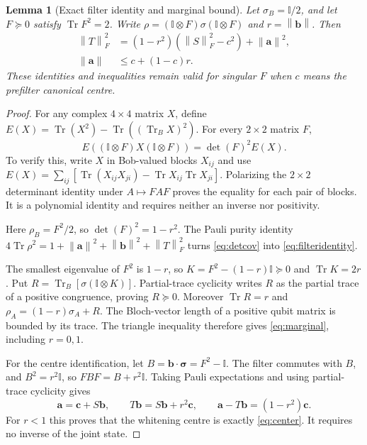 \documentclass[11pt,a4paper]{article}
\newtheorem{lemma}[theorem]{Lemma}
\theoremstyle{remark}\newtheorem{remark}[theorem]{Remark}
\newcommand{\Tr}{\operatorname{Tr}}
\newcommand{\Id}{\mathbb I}
\newcommand{\norm}[1]{\left\lVert#1\right\rVert}
\newcommand{\bs}{\boldsymbol\sigma}
\renewcommand{\aa}{\mathbf a}\newcommand{\bb}{\mathbf b}
\newcommand{\cc}{\mathbf c}\newcommand{\nn}{\mathbf n}
\begin{document}
\begin{lemma}[Exact filter identity and marginal bound]\label{lem:filter}
Let $\sigma_B=\Id/2$, and let $F\succeq0$ satisfy $\Tr F^2=2$.
Write $\rho=(\Id\otimes F)\sigma(\Id\otimes F)$ and $r=\norm\bb$. Then
\begin{align}
\norm T_F^2&=(1-r^2)(\norm S_F^2-c^2)+\norm\aa^2,\label{eq:filteridentity}\\
\norm\aa&\leq c+(1-c)r.\label{eq:marginal}
\end{align}
These identities and inequalities remain valid for singular $F$ when $c$
means the prefilter canonical centre.
\end{lemma}
\begin{proof}
For any complex $4\times4$ matrix $X$, define
$E(X)=\Tr(X^2)-\Tr((\Tr_BX)^2)$. For every $2\times2$ matrix $F$,
\begin{equation}\label{eq:detcov}
E((\Id\otimes F)X(\Id\otimes F))=\det(F)^2E(X).
\end{equation}
To verify this, write $X$ in Bob-valued blocks $X_{ij}$ and use
$E(X)=\sum_{ij}[\Tr(X_{ij}X_{ji})-\Tr X_{ij}\Tr X_{ji}]$.
Polarizing the $2\times2$ determinant identity under $A\mapsto FAF$ proves
the equality for each pair of blocks. It is a polynomial identity and
requires neither an inverse nor positivity.

Here $\rho_B=F^2/2$, so $\det(F)^2=1-r^2$.
The Pauli purity identity
$4\Tr\rho^2=1+\norm\aa^2+\norm\bb^2+\norm T_F^2$
turns \eqref{eq:detcov} into \eqref{eq:filteridentity}.

The smallest eigenvalue of $F^2$ is $1-r$, so
$K=F^2-(1-r)\Id\succeq0$ and $\Tr K=2r$. Put
$R=\Tr_B[\sigma(\Id\otimes K)]$. Partial-trace cyclicity writes $R$ as the
partial trace of a positive congruence, proving $R\succeq0$. Moreover
$\Tr R=r$ and $\rho_A=(1-r)\sigma_A+R$.
The Bloch-vector length of a positive qubit matrix is bounded by its trace.
The triangle inequality therefore gives \eqref{eq:marginal}, including $r=0,1$.

For the centre identification, let $B=\bb\cdot\bs=F^2-\Id$.
The filter commutes with $B$, and $B^2=r^2\Id$, so
$FBF=B+r^2\Id$. Taking Pauli expectations and using partial-trace cyclicity
gives
\[
\aa=\cc+S\bb,\qquad T\bb=S\bb+r^2\cc,\qquad
\aa-T\bb=(1-r^2)\cc.
\]
For $r<1$ this proves that the whitening centre is exactly
\eqref{eq:center}. It requires no inverse of the joint state.
\end{proof}
\end{document}
